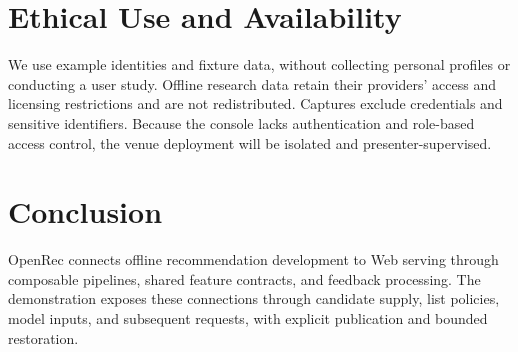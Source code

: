 \documentclass[sigconf,screen,review]{acmart}
\begin{document}
\balance
\section{Ethical Use and Availability}
We use example identities and fixture data, without collecting personal profiles or conducting a user study. Offline research data retain their providers' access and licensing restrictions and are not redistributed. Captures exclude credentials and sensitive identifiers. Because the console lacks authentication and role-based access control, the venue deployment will be isolated and presenter-supervised.

\section{Conclusion}
OpenRec connects offline recommendation development to Web serving through composable pipelines, shared feature contracts, and feedback processing. The demonstration exposes these connections through candidate supply, list policies, model inputs, and subsequent requests, with explicit publication and bounded restoration.



\end{document}

